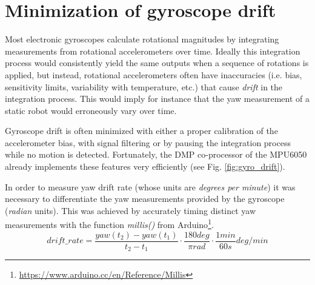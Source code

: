 \documentclass[12pt,twoside]{report}
\begin{document}
\newpage
\section{Minimization of gyroscope drift} \label{sec:gyro_section}

Most electronic gyroscopes calculate rotational magnitudes by integrating measurements from rotational accelerometers over time.
Ideally this integration process would consistently yield the same outputs when a sequence of rotations is applied, but instead, rotational accelerometers often have inaccuracies (i.e. bias, sensitivity limits, variability with temperature, etc.) that cause \emph{drift} in the integration process.
This would imply for instance that the yaw measurement of a static robot would erroneously vary over time.

Gyroscope drift is often minimized with either a proper calibration of the accelerometer bias, with signal filtering or by pausing the integration process while no motion is detected. Fortunately, the DMP co-processor of the MPU6050 already implements these features very efficiently (see Fig. \ref{fig:gyro_drift}).

In order to measure yaw drift rate (whose units are \emph{degrees per minute}) it was necessary to differentiate the yaw measurements provided by the gyroscope (\emph{radian} units). This was achieved by accurately timing distinct yaw measurements with the function \emph{millis()} from Arduino\footnote{\url{https://www.arduino.cc/en/Reference/Millis}}.
\begin{equation}
drift\_rate=\frac{yaw(t_2)-yaw(t_1)}{t_2-t_1}\cdot\frac{180 deg}{\pi rad}\cdot\frac{1 min}{60 s}deg/min
\end{equation}

\vspace{-5mm}
\end{document}
